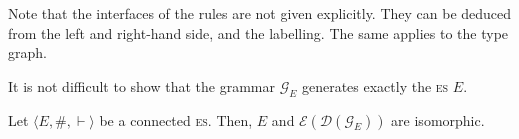 \documentclass[conference]{IEEEtran}
\newcommand{\full}[1]{}
\newcommand{\full}[1]{{#1}}
\newcommand{\esabbr}{\textsc{es}}
\newcommand{\zev}[0]{\ensuremath{\mathcal{E}}}
\newcommand{\ev}[1]{\ensuremath{\zev({#1})}}
\newcommand{\zdom}[0]{\ensuremath{\mathcal{D}}}
\newcommand{\dom}[1]{\ensuremath{\zdom({#1})}}
\begin{document}
\full{
Then the type graph is
\[
  T = (\bigcup_{e\#e'} C_{e,e'}) \cup
  \bigcup_{e \in E}  (I_e \cup S_e \cup \bigcup_{u \in U_e} L_{u,e})
\]
}
\smallskip

Note that the interfaces of the rules are not given explicitly. They
can be deduced from the left and right-hand side, and the
labelling. The same applies to the type graph.

%
It is not difficult to show that the grammar
$\mathcal{G}_{E}$ generates exactly the {\esabbr} ${E}$. 

\begin{theorem}
  Let $\langle E, \#, \vdash \rangle$ be a 
  connected {\esabbr}.  Then,
  ${E}$ and $\ev{\dom{\mathcal{G}_{E}}}$ are isomorphic.
\end{theorem}
\end{document}
